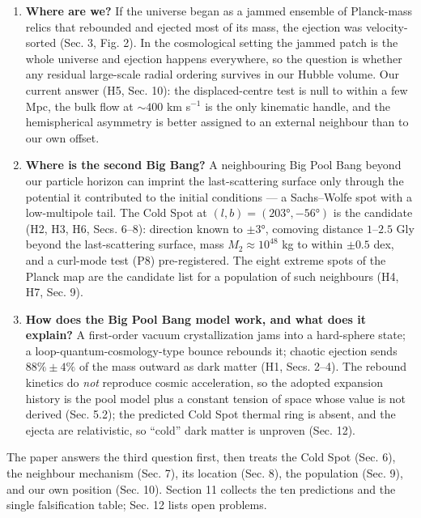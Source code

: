 \documentclass[
]{article}
\begin{document}
\begin{enumerate}
\def\labelenumi{\arabic{enumi}.}
\item
  \textbf{Where are we?} If the universe began as a jammed ensemble of
  Planck-mass relics that rebounded and ejected most of its mass, the
  ejection was velocity-sorted (Sec. 3, Fig. 2). In the cosmological
  setting the jammed patch is the whole universe and ejection happens
  everywhere, so the question is whether any residual large-scale radial
  ordering survives in our Hubble volume. Our current answer (H5, Sec.
  10): the displaced-centre test is null to within a few Mpc, the bulk
  flow at \(\sim\!400\) km s\(^{-1}\) is the only kinematic handle, and
  the hemispherical asymmetry is better assigned to an external
  neighbour than to our own offset.
\item
  \textbf{Where is the second Big Bang?} A neighbouring Big Pool Bang
  beyond our particle horizon can imprint the last-scattering surface
  only through the potential it contributed to the initial conditions
  --- a Sachs--Wolfe spot with a low-multipole tail. The Cold Spot at
  \((l,b) = (203°, -56°)\) is the candidate (H2, H3, H6, Secs. 6--8):
  direction known to \(\pm 3°\), comoving distance \(1\)--\(2.5\) Gly
  beyond the last-scattering surface, mass \(M_2 \approx 10^{48}\) kg to
  within \(\pm 0.5\) dex, and a curl-mode test (P8) pre-registered. The
  eight extreme spots of the Planck map are the candidate list for a
  population of such neighbours (H4, H7, Sec. 9).
\item
  \textbf{How does the Big Pool Bang model work, and what does it
  explain?} A first-order vacuum crystallization jams into a hard-sphere
  state; a loop-quantum-cosmology-type bounce rebounds it; chaotic
  ejection sends \(88\% \pm 4\%\) of the mass outward as dark matter
  (H1, Secs. 2--4). The rebound kinetics do \emph{not} reproduce cosmic
  acceleration, so the adopted expansion history is the pool model plus
  a constant tension of space whose value is not derived (Sec. 5.2); the
  predicted Cold Spot thermal ring is absent, and the ejecta are
  relativistic, so ``cold'' dark matter is unproven (Sec. 12).
\end{enumerate}

The paper answers the third question first, then treats the Cold Spot
(Sec. 6), the neighbour mechanism (Sec. 7), its location (Sec. 8), the
population (Sec. 9), and our own position (Sec. 10). Section 11 collects
the ten predictions and the single falsification table; Sec. 12 lists
open problems.
\end{document}
